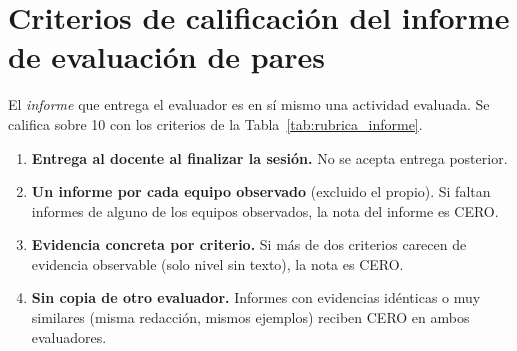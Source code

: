 \documentclass[11pt]{article}
\begin{document}
\section{\textcolor{utegreendk}{Criterios de calificación del informe de evaluación de pares}}

El \emph{informe} que entrega el evaluador es en sí mismo una actividad evaluada. Se califica sobre 10 con los criterios de la Tabla~\ref{tab:rubrica_informe}.

\begin{cajapiso}[title={Criterios de piso del informe: incumplimiento implica CERO en el informe}]
	\begin{enumerate}[label=\textbf{P\arabic*.},leftmargin=24pt,itemsep=3pt]
		\item \textbf{Entrega al docente al finalizar la sesión.} No se acepta entrega posterior.
		\item \textbf{Un informe por cada equipo observado} (excluido el propio). Si faltan informes de alguno de los equipos observados, la nota del informe es CERO.
		\item \textbf{Evidencia concreta por criterio.} Si más de dos criterios carecen de evidencia observable (solo nivel sin texto), la nota es CERO.
		\item \textbf{Sin copia de otro evaluador.} Informes con evidencias idénticas o muy similares (misma redacción, mismos ejemplos) reciben CERO en ambos evaluadores.
	\end{enumerate}
\end{cajapiso}
\end{document}
